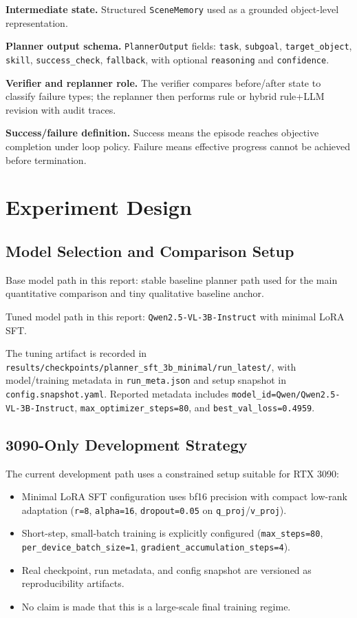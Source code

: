 \documentclass{article}
\begin{document}
\textbf{Intermediate state.} Structured \texttt{SceneMemory} used as a grounded object-level representation.

\textbf{Planner output schema.} \texttt{PlannerOutput} fields:
\texttt{task}, \texttt{subgoal}, \texttt{target\_object}, \texttt{skill}, \texttt{success\_check}, \texttt{fallback}, with optional \texttt{reasoning} and \texttt{confidence}.

\textbf{Verifier and replanner role.} The verifier compares before/after state to classify failure types; the replanner then performs rule or hybrid rule+LLM revision with audit traces.

\textbf{Success/failure definition.} Success means the episode reaches objective completion under loop policy. Failure means effective progress cannot be achieved before termination.

\section{Experiment Design}
\subsection{Model Selection and Comparison Setup}
Base model path in this report: stable baseline planner path used for the main quantitative comparison and tiny qualitative baseline anchor.

Tuned model path in this report: \texttt{Qwen2.5-VL-3B-Instruct} with minimal LoRA SFT.

The tuning artifact is recorded in \texttt{results/checkpoints/planner\_sft\_3b\_minimal/run\_latest/}, with model/training metadata in \texttt{run\_meta.json} and setup snapshot in \texttt{config.snapshot.yaml}. Reported metadata includes \texttt{model\_id=Qwen/Qwen2.5-VL-3B-Instruct}, \texttt{max\_optimizer\_steps=80}, and \texttt{best\_val\_loss=0.4959}.

\subsection{3090-Only Development Strategy}
The current development path uses a constrained setup suitable for RTX 3090:
\begin{itemize}[leftmargin=*]
  \item Minimal LoRA SFT configuration uses bf16 precision with compact low-rank adaptation (\texttt{r=8}, \texttt{alpha=16}, \texttt{dropout=0.05} on \texttt{q\_proj}/\texttt{v\_proj}).
  \item Short-step, small-batch training is explicitly configured (\texttt{max\_steps=80}, \texttt{per\_device\_batch\_size=1}, \texttt{gradient\_accumulation\_steps=4}).
  \item Real checkpoint, run metadata, and config snapshot are versioned as reproducibility artifacts.
  \item No claim is made that this is a large-scale final training regime.
\end{itemize}
\end{document}
